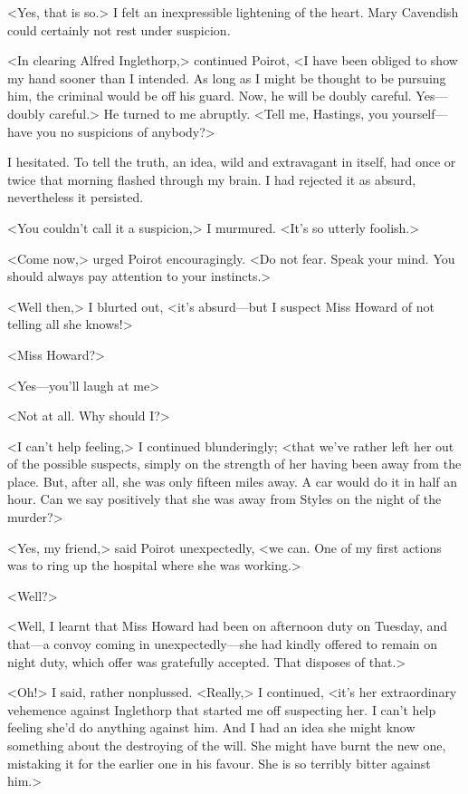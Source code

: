  <Yes, that is so.> I felt an inexpressible lightening of the heart. Mary Cavendish could certainly not rest under suspicion. 

 <In clearing Alfred Inglethorp,> continued Poirot, <I have been obliged to show my hand sooner than I intended. As long as I might be thought to be pursuing him, the criminal would be off his guard. Now, he will be doubly careful. Yes—doubly careful.> He turned to me abruptly. <Tell me, Hastings, you yourself—have you no suspicions of anybody?> 

 I hesitated. To tell the truth, an idea, wild and extravagant in itself, had once or twice that morning flashed through my brain. I had rejected it as absurd, nevertheless it persisted. 

 <You couldn't call it a suspicion,> I murmured. <It's so utterly foolish.> 

 <Come now,> urged Poirot encouragingly. <Do not fear. Speak your mind. You should always pay attention to your instincts.> 

 <Well then,> I blurted out, <it's absurd—but I suspect Miss Howard of not telling all she knows!> 

 <Miss Howard?> 

 <Yes—you'll laugh at me\longdash> 

 <Not at all. Why should I?> 

 <I can't help feeling,> I continued blunderingly; <that we've rather left her out of the possible suspects, simply on the strength of her having been away from the place. But, after all, she was only fifteen miles away. A car would do it in half an hour. Can we say positively that she was away from Styles on the night of the murder?> 

 <Yes, my friend,> said Poirot unexpectedly, <we can. One of my first actions was to ring up the hospital where she was working.> 

 <Well?> 

 <Well, I learnt that Miss Howard had been on afternoon duty on Tuesday, and that—a convoy coming in unexpectedly—she had kindly offered to remain on night duty, which offer was gratefully accepted. That disposes of that.> 

 <Oh!> I said, rather nonplussed. <Really,> I continued, <it's her extraordinary vehemence against Inglethorp that started me off suspecting her. I can't help feeling she'd do anything against him. And I had an idea she might know something about the destroying of the will. She might have burnt the new one, mistaking it for the earlier one in his favour. She is so terribly bitter against him.> 

